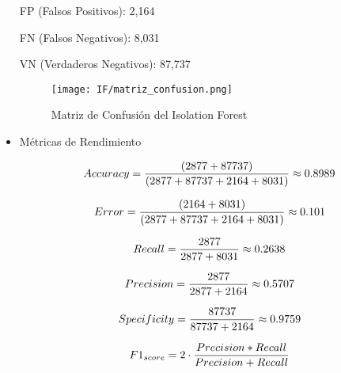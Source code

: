 \begin{itemize}
            FP (Falsos Positivos): 2,164

            FN (Falsos Negativos): 8,031

            VN (Verdaderos Negativos): 87,737

            \begin{figure}[ht!]
                  \centering
                  \texttt{[image: IF/matriz\_confusion.png]}
                  \caption{Matriz de Confusión del Isolation Forest}
                  \label{fig:confusion_matrix_if}
            \end{figure}

      \item Métricas de Rendimiento

            \begin{align}
                  Accuracy = \frac{(2877+87737)}{(2877+87737+2164+8031)}\approx 0.8989 \notag \\
                  \label{eq:accuracy_if}
            \end{align}


            \begin{align}
                  Error = \frac{(2164+8031)}{(2877+87737+2164+8031)}\approx 0.101 \notag \\
                  \label{eq:error_if}
            \end{align}

            \begin{align}
                  Recall = \frac{2877}{2877+8031}\approx 0.2638 \notag \\
                  \label{eq:recall_if}
            \end{align}

            \begin{align}
                  Precision = \frac{2877}{2877+2164}\approx 0.5707 \notag \\
                  \label{eq:precision_if}
            \end{align}

            \begin{align}
                  Specificity = \frac{87737}{87737+2164}\approx 0.9759 \notag \\
                  \label{eq:specificity_if}
            \end{align}

            \begin{align}
                  F1_{score} = 2 \cdot \frac{Precision * Recall}{Precision+Recall} \notag \\
                  \label{eq:f1_if}
            \end{align}

\end{itemize}

